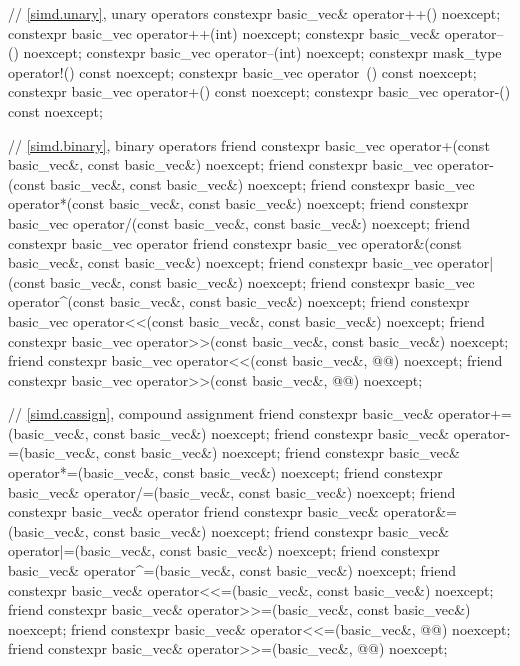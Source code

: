 \begin{codeblock}
{{    // \ref{simd.unary},  unary operators
    constexpr basic_vec& operator++() noexcept;
    constexpr basic_vec operator++(int) noexcept;
    constexpr basic_vec& operator--() noexcept;
    constexpr basic_vec operator--(int) noexcept;
    constexpr mask_type operator!() const noexcept;
    constexpr basic_vec operator~() const noexcept;
    constexpr basic_vec operator+() const noexcept;
    constexpr basic_vec operator-() const noexcept;

    // \ref{simd.binary},  binary operators
    friend constexpr basic_vec operator+(const basic_vec&, const basic_vec&) noexcept;
    friend constexpr basic_vec operator-(const basic_vec&, const basic_vec&) noexcept;
    friend constexpr basic_vec operator*(const basic_vec&, const basic_vec&) noexcept;
    friend constexpr basic_vec operator/(const basic_vec&, const basic_vec&) noexcept;
    friend constexpr basic_vec operator%
    friend constexpr basic_vec operator&(const basic_vec&, const basic_vec&) noexcept;
    friend constexpr basic_vec operator|(const basic_vec&, const basic_vec&) noexcept;
    friend constexpr basic_vec operator^(const basic_vec&, const basic_vec&) noexcept;
    friend constexpr basic_vec operator<<(const basic_vec&, const basic_vec&) noexcept;
    friend constexpr basic_vec operator>>(const basic_vec&, const basic_vec&) noexcept;
    friend constexpr basic_vec operator<<(const basic_vec&, @@) noexcept;
    friend constexpr basic_vec operator>>(const basic_vec&, @@) noexcept;

    // \ref{simd.cassign},  compound assignment
    friend constexpr basic_vec& operator+=(basic_vec&, const basic_vec&) noexcept;
    friend constexpr basic_vec& operator-=(basic_vec&, const basic_vec&) noexcept;
    friend constexpr basic_vec& operator*=(basic_vec&, const basic_vec&) noexcept;
    friend constexpr basic_vec& operator/=(basic_vec&, const basic_vec&) noexcept;
    friend constexpr basic_vec& operator%
    friend constexpr basic_vec& operator&=(basic_vec&, const basic_vec&) noexcept;
    friend constexpr basic_vec& operator|=(basic_vec&, const basic_vec&) noexcept;
    friend constexpr basic_vec& operator^=(basic_vec&, const basic_vec&) noexcept;
    friend constexpr basic_vec& operator<<=(basic_vec&, const basic_vec&) noexcept;
    friend constexpr basic_vec& operator>>=(basic_vec&, const basic_vec&) noexcept;
    friend constexpr basic_vec& operator<<=(basic_vec&, @@) noexcept;
    friend constexpr basic_vec& operator>>=(basic_vec&, @@) noexcept;

}}
\end{codeblock}
